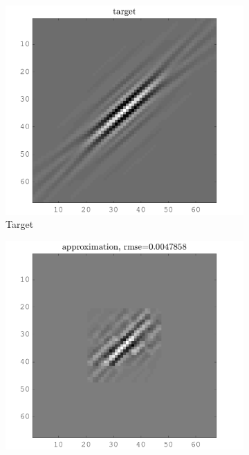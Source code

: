 \begin{figure}[!ht]\centering
\begin{subfigure}[b]{0.49\textwidth}\centering
\includegraphics[width=\textwidth]{figures/xp/xp_128x128_sc2_angl1_K3_S3_node4_target.png}
\caption{Target}
\end{subfigure}
\begin{subfigure}[b]{0.49\textwidth}\centering
\includegraphics[width=\textwidth]{figures/xp/xp_128x128_sc2_angl1_K3_S3_node4_approx.png}

\end{subfigure}
\end{figure}
